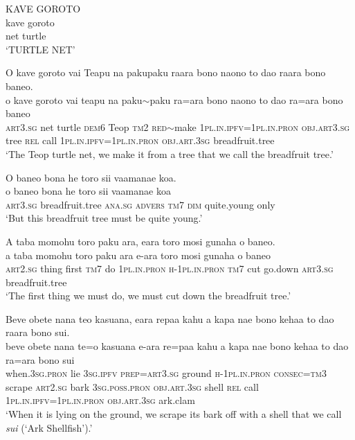 \ea\label{ex:text20-1}
KAVE GOROTO\\
\gll kave	goroto\\
     net	turtle\\
\glt `TURTLE NET'
\z

\ea\label{ex:text20-2}
O kave goroto vai Teapu na pakupaku raara bono naono to dao raara bono baneo.\\
\gll o	kave	goroto	vai	teapu	na	paku{$\sim$}paku	ra=ara	bono	naono	to	dao	ra=ara	bono	baneo\\
     \textsc{art}3.\textsc{sg}	net	turtle	\textsc{dem}6	Teop	\textsc{tm}2	\textsc{red}{$\sim$}make	1\textsc{pl}.\textsc{in}.\textsc{ipfv}=1\textsc{pl}.\textsc{in}.\textsc{pron}	\textsc{obj}.\textsc{art}3.\textsc{sg}	tree	\textsc{rel}	call	1\textsc{pl}.\textsc{in}.\textsc{ipfv}=1\textsc{pl}.\textsc{in}.\textsc{pron}	\textsc{obj}.\textsc{art}.3\textsc{sg}	breadfruit.tree\\
\glt `The Teop turtle net, we make it from a tree that we call the breadfruit tree.'
\z

\ea\label{ex:text20-3}
O baneo bona he toro sii vaamanae koa.\\
\gll o	baneo	bona	he	toro	sii	vaamanae	koa\\
     \textsc{art}3.\textsc{sg}	breadfruit.tree	\textsc{ana}.\textsc{sg}	\textsc{advers}	\textsc{tm}7	\textsc{dim}	quite.young	only\\
\glt `But this breadfruit tree must be quite young.'
\z

\ea\label{ex:text20-4}
A taba momohu toro paku ara, eara toro mosi gunaha o baneo.\\
\gll a	taba	momohu	toro	paku	ara	e-ara	toro	mosi	gunaha	o	baneo\\
     \textsc{art}2.\textsc{sg}	thing	first	\textsc{tm}7	do	1\textsc{pl}.\textsc{in}.\textsc{pron}	\textsc{h}-1\textsc{pl}.\textsc{in}.\textsc{pron}	\textsc{tm}7	cut	go.down	\textsc{art}3.\textsc{sg}	breadfruit.tree\\
\glt `The first thing we must do, we must cut down the breadfruit tree.'
\z

\ea\label{ex:text20-5}
Beve obete nana teo kasuana, eara repaa kahu a kapa nae bono kehaa to dao raara bono sui.\\
\gll beve	obete	nana	te=o	kasuana	e-ara	re=paa	kahu	a	kapa	nae	bono	kehaa	to	dao	ra=ara	bono	sui\\
     when.3\textsc{sg}.\textsc{pron}	lie	3\textsc{sg}.\textsc{ipfv}	\textsc{prep}=\textsc{art}3.\textsc{sg}	ground	\textsc{h}-1\textsc{pl}.\textsc{in}.\textsc{pron}	\textsc{consec}=\textsc{tm}3	scrape	\textsc{art}2.\textsc{sg}	bark	3\textsc{sg}.\textsc{poss}.\textsc{pron}	\textsc{obj}.\textsc{art}.3\textsc{sg}	shell	\textsc{rel}	call	1\textsc{pl}.\textsc{in}.\textsc{ipfv}=1\textsc{pl}.\textsc{in}.\textsc{pron}	\textsc{obj}.\textsc{art}.3\textsc{sg}	ark.clam\\
\glt `When it is lying on the ground, we scrape its bark off with a shell that we call \textit{sui} (`Ark Shellfish').'
\z

